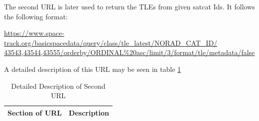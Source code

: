 \documentclass[12pt]{article}
\begin{document}
	
	The second URL is later used to return the TLEs from given satcat Ids. It follows the following format:\par 
	
	
		\url{	https://www.space-track.org/basicspacedata/query/class/tle_latest/NORAD_CAT_ID/ 43543,43544,43555/orderby/ORDINAL%
		}
	
	A detailed description of this URL may be seen in table \ref{tab:tle2url}
	
	\begin{table}[H]\singlespacing
		\caption{Detailed Description of Second URL}
		\label{tab:tle2url}
		\begin{tabular}{|p{6cm}|p{10cm}|}
			\hline
			Section of URL                                    & Description                                                                                                                                                                                                                                     \\ \hline
			

\end{tabular}
\end{table}
\end{document}
